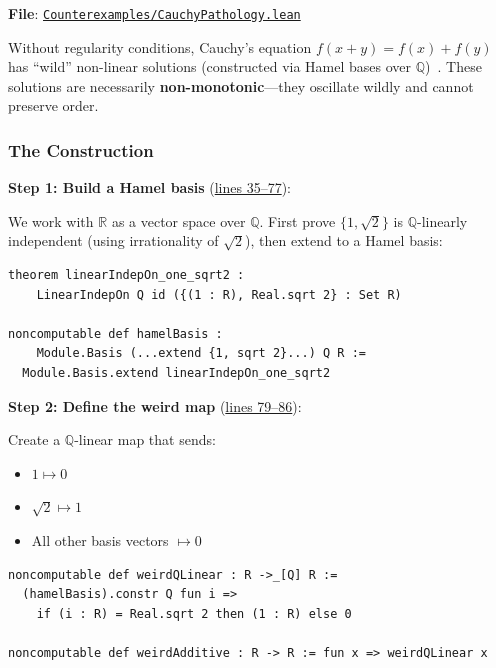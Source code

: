 \documentclass[11pt]{article}
\theoremstyle{definition}
\theoremstyle{remark}
\begin{document}
\textbf{File}: \href{https://github.com/zariuq/ks-foundations-of-inference/blob/main/KnuthSkilling/Counterexamples/CauchyPathology.lean}{\texttt{Counterexamples/CauchyPathology.lean}}

Without regularity conditions, Cauchy's equation $f(x+y) = f(x) + f(y)$ has
``wild'' non-linear solutions (constructed via Hamel bases over $\mathbb{Q}$)~\cite{Aczel1966}.
These solutions are necessarily \textbf{non-monotonic}---they oscillate wildly
and cannot preserve order.

\subsubsection{The Construction}

\textbf{Step 1: Build a Hamel basis} (\href{https://github.com/zariuq/ks-foundations-of-inference/blob/main/KnuthSkilling/Counterexamples/CauchyPathology.lean\#L35-L77}{lines 35--77}):

We work with $\mathbb{R}$ as a vector space over $\mathbb{Q}$. First prove $\{1, \sqrt{2}\}$ is
$\mathbb{Q}$-linearly independent (using irrationality of $\sqrt{2}$), then extend to a Hamel basis:

\begin{lstlisting}[caption={Hamel basis extending $\{1, \sqrt{2}\}$}]
theorem linearIndepOn_one_sqrt2 :
    LinearIndepOn Q id ({(1 : R), Real.sqrt 2} : Set R)

noncomputable def hamelBasis :
    Module.Basis (...extend {1, sqrt 2}...) Q R :=
  Module.Basis.extend linearIndepOn_one_sqrt2
\end{lstlisting}

\textbf{Step 2: Define the weird map} (\href{https://github.com/zariuq/ks-foundations-of-inference/blob/main/KnuthSkilling/Counterexamples/CauchyPathology.lean\#L79-L86}{lines 79--86}):

Create a $\mathbb{Q}$-linear map that sends:
\begin{itemize}
\item $1 \mapsto 0$
\item $\sqrt{2} \mapsto 1$
\item All other basis vectors $\mapsto 0$
\end{itemize}

\begin{lstlisting}[caption={Definition of weirdAdditive}]
noncomputable def weirdQLinear : R ->_[Q] R :=
  (hamelBasis).constr Q fun i =>
    if (i : R) = Real.sqrt 2 then (1 : R) else 0

noncomputable def weirdAdditive : R -> R := fun x => weirdQLinear x
\end{lstlisting}
\end{document}
